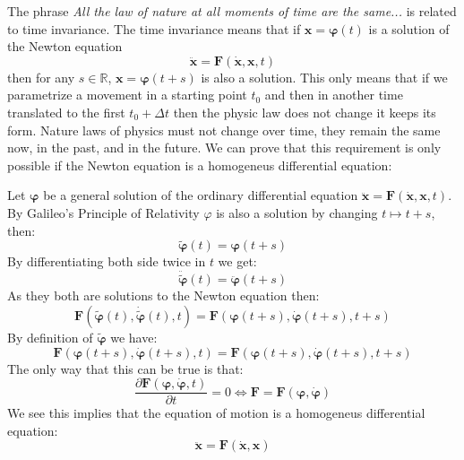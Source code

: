 \documentclass[10pt, letterpaper, oneside]{book}
\theoremstyle{theorem} %
\theoremstyle{theorem} %
\theoremstyle{definition}
\theoremstyle{remark}
\theoremstyle{definition}
\theoremstyle{definition}
\theoremstyle{theorem}
\def\Re{\mathbb{R}}
\newcommand{\mb}[1]{\mathbf{#1}} %
\begin{document}
The phrase \textit{All the law of nature at all moments of time are the same...} is related to time invariance. The time invariance means that if $\mb{x}={\boldsymbol \varphi}(t)$ is a solution of the Newton equation
\begin{equation}
	\ddot{\mb{x}} = \mb{F}(\dot{\mb{x}},\mathbf{x},t)
\end{equation}
then for any $s\in\Re$, $\mb{x}={\boldsymbol \varphi}(t+s)$ is also a solution. This only means that if we parametrize a movement in a starting point $t_0$ and then in another time translated to the first $t_0+\Delta t$ then the physic law does not change it keeps its form. Nature laws of physics must not change over time, they remain the same now, in the past, and in the future. We can prove that this requirement is only possible if the Newton equation is a homogeneus differential equation:

Let ${\boldsymbol \varphi}$ be a general solution of the ordinary differential equation $\ddot{\mb{x}}=\mb{F}(\dot{\mb{x}},\mb{x},t)$. By Galileo's Principle of Relativity ${\varphi}$ is also a solution by changing $t\mapsto t+s$, then:
\begin{equation}
	\tilde{\boldsymbol \varphi}(t)={\boldsymbol \varphi}(t+s)
\end{equation}
By differentiating both side twice in $t$ we get:
\begin{equation}
	\ddot{\tilde{\boldsymbol \varphi}}(t)=\ddot{\boldsymbol \varphi}(t+s)
\end{equation}
As they both are solutions to the Newton equation then:
\begin{equation}
	\mb{F}\left(\tilde{\boldsymbol \varphi}(t),\dot{\tilde{\boldsymbol \varphi}}(t),t\right) = \mb{F}\left({\boldsymbol \varphi}(t+s),\dot{\boldsymbol \varphi}(t+s),t+s\right)
\end{equation}
By definition of $\tilde{\boldsymbol \varphi}$ we have:
\begin{equation}
	\mb{F}\left({\boldsymbol \varphi}(t+s),\dot{\boldsymbol \varphi}(t+s),t\right) = \mb{F}\left({\boldsymbol \varphi}(t+s),\dot{\boldsymbol \varphi}(t+s),t+s\right)
\end{equation}
The only way that this can be true is that:
\begin{equation}
	\frac{\partial \mb{F}({\boldsymbol \varphi},\dot{\boldsymbol \varphi},t)}{\partial t}=0 \Longleftrightarrow \mb{F}=\mb{F}({\boldsymbol \varphi},\dot{\boldsymbol \varphi})
\end{equation}
We see this implies that the equation of motion is a homogeneus differential equation:
\begin{equation}
	\ddot{\mb{x}} = \mb{F}(\dot{\mb{x}},\mb{x})
\end{equation}
\end{document}
